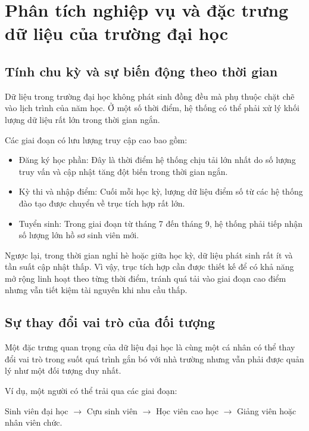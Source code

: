 \newpage
\section{Phân tích nghiệp vụ và đặc trưng dữ liệu của trường đại học}

    \subsection{Tính chu kỳ và sự biến động theo thời gian}
    
    Dữ liệu trong trường đại học không phát sinh đồng đều mà phụ thuộc chặt chẽ vào lịch trình của năm học. Ở một số thời điểm, hệ thống có thể phải xử lý khối lượng dữ liệu rất lớn trong thời gian ngắn.
    
    Các giai đoạn có lưu lượng truy cập cao bao gồm:
    \begin{itemize}
        \item Đăng ký học phần: Đây là thời điểm hệ thống chịu tải lớn nhất do số lượng truy vấn và cập nhật tăng đột biến trong thời gian ngắn.
        \item Kỳ thi và nhập điểm: Cuối mỗi học kỳ, lượng dữ liệu điểm số từ các hệ thống đào tạo được chuyển về trục tích hợp rất lớn.
        \item Tuyển sinh: Trong giai đoạn từ tháng 7 đến tháng 9, hệ thống phải tiếp nhận số lượng lớn hồ sơ sinh viên mới.
    \end{itemize}
    
    Ngược lại, trong thời gian nghỉ hè hoặc giữa học kỳ, dữ liệu phát sinh rất ít và tần suất cập nhật thấp. Vì vậy, trục tích hợp cần được thiết kế để có khả năng mở rộng linh hoạt theo từng thời điểm, tránh quá tải vào giai đoạn cao điểm nhưng vẫn tiết kiệm tài nguyên khi nhu cầu thấp.

    \subsection{Sự thay đổi vai trò của đối tượng}
    
    Một đặc trưng quan trọng của dữ liệu đại học là cùng một cá nhân có thể thay đổi vai trò trong suốt quá trình gắn bó với nhà trường nhưng vẫn phải được quản lý như một đối tượng duy nhất.
    
    Ví dụ, một người có thể trải qua các giai đoạn:
    
    Sinh viên đại học $\rightarrow$ Cựu sinh viên $\rightarrow$ Học viên cao học $\rightarrow$ Giảng viên hoặc nhân viên chức.
    
